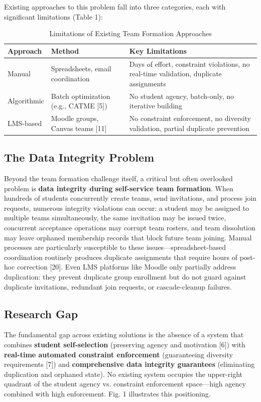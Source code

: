 \documentclass[12pt,a4paper]{article}
\begin{document}
Existing approaches to this problem fall into three categories, each with significant limitations (Table 1):

\begin{table}[H]
\centering
\caption{Limitations of Existing Team Formation Approaches}
\begin{tabular}{@{}p{2.5cm}p{4cm}p{5cm}@{}}
\toprule
\textbf{Approach} & \textbf{Method} & \textbf{Key Limitations} \\
\midrule
Manual & Spreadsheets, email coordination & Days of effort, constraint violations, no real-time validation, duplicate assignments \\
Algorithmic & Batch optimization (e.g., CATME [5]) & No student agency, batch-only, no iterative building \\
LMS-based & Moodle groups, Canvas teams [11] & No constraint enforcement, no diversity validation, partial duplicate prevention \\
\bottomrule
\end{tabular}
\end{table}

\subsection{The Data Integrity Problem}

Beyond the team formation challenge itself, a critical but often overlooked problem is \textbf{data integrity during self-service team formation}. When hundreds of students concurrently create teams, send invitations, and process join requests, numerous integrity violations can occur: a student may be assigned to multiple teams simultaneously, the same invitation may be issued twice, concurrent acceptance operations may corrupt team rosters, and team dissolution may leave orphaned membership records that block future team joining. Manual processes are particularly susceptible to these issues---spreadsheet-based coordination routinely produces duplicate assignments that require hours of post-hoc correction [20]. Even LMS platforms like Moodle only partially address duplication: they prevent duplicate group enrollment but do not guard against duplicate invitations, redundant join requests, or cascade-cleanup failures.

\subsection{Research Gap}

The fundamental gap across existing solutions is the absence of a system that combines \textbf{student self-selection} (preserving agency and motivation [6]) with \textbf{real-time automated constraint enforcement} (guaranteeing diversity requirements [7]) and \textbf{comprehensive data integrity guarantees} (eliminating duplication and orphaned state). No existing system occupies the upper-right quadrant of the student agency vs. constraint enforcement space---high agency combined with high enforcement. Fig. 1 illustrates this positioning.
\end{document}
